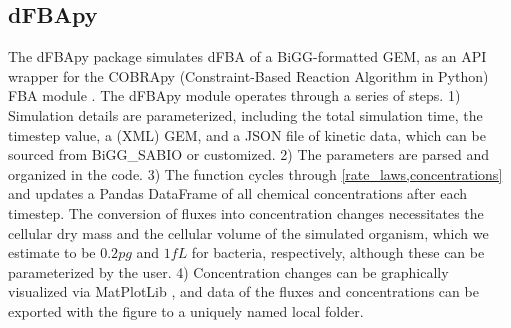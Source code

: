 \subsection{dFBApy}
The dFBApy package simulates dFBA of a BiGG-formatted GEM, as an API wrapper for the COBRApy (Constraint-Based Reaction Algorithm in Python) FBA module \cite{Schellenberger2011QuantitativeV2.0,Lloyd2018COBRAme:Expression}. The dFBApy module operates through a series of steps. 1) Simulation details are parameterized, including the total simulation time, the timestep value, a (XML) GEM, and a JSON file of kinetic data, which can be sourced from BiGG\_SABIO or customized. 2) The parameters are parsed and organized in the code. 3) The  function cycles through \cref{rate_laws,concentrations} and updates a Pandas DataFrame \cite{McKinney2011Pandas:Statistics} of all chemical concentrations after each timestep. The conversion of fluxes into concentration changes necessitates the cellular dry mass and the cellular volume of the simulated organism, which we estimate to be $0.2 pg$ \cite{Loferer-Krobacher1998DeterminationAnalysis} and $1 fL$ \cite{Lewis2014MassPopulations} for bacteria, respectively, although these can be parameterized by the user. 4) Concentration changes can be graphically visualized via MatPlotLib \cite{Hunter2007Matplotlib:Environment}, and data of the fluxes and concentrations can be exported with the figure to a uniquely named local folder. 

